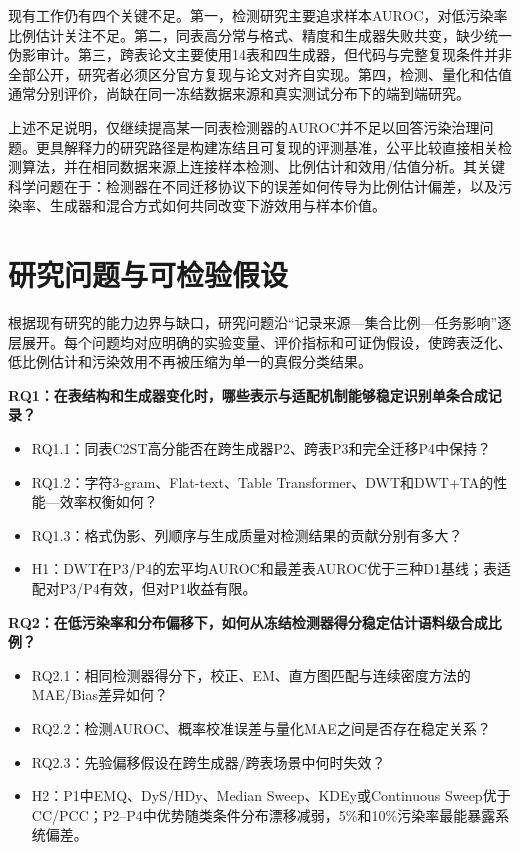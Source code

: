 \documentclass[
  chinese,
  12pt,
  a4paper,
  chinese,
  UTF8]{ctexart}
\providecommand{\tightlist}{%
  \setlength{\itemsep}{0pt}\setlength{\parskip}{0pt}}
\begin{document}
现有工作仍有四个关键不足。第一，检测研究主要追求样本AUROC，对低污染率比例估计关注不足。第二，同表高分常与格式、精度和生成器失败共变，缺少统一伪影审计。第三，跨表论文主要使用14表和四生成器，但代码与完整复现条件并非全部公开，研究者必须区分官方复现与论文对齐自实现。第四，检测、量化和估值通常分别评价，尚缺在同一冻结数据来源和真实测试分布下的端到端研究。

上述不足说明，仅继续提高某一同表检测器的AUROC并不足以回答污染治理问题。更具解释力的研究路径是构建冻结且可复现的评测基准，公平比较直接相关检测算法，并在相同数据来源上连接样本检测、比例估计和效用/估值分析。其关键科学问题在于：检测器在不同迁移协议下的误差如何传导为比例估计偏差，以及污染率、生成器和混合方式如何共同改变下游效用与样本价值。

\section{研究问题与可检验假设}\label{ux7814ux7a76ux95eeux9898ux4e0eux53efux68c0ux9a8cux5047ux8bbe}

根据现有研究的能力边界与缺口，研究问题沿``记录来源---集合比例---任务影响''逐层展开。每个问题均对应明确的实验变量、评价指标和可证伪假设，使跨表泛化、低比例估计和污染效用不再被压缩为单一的真假分类结果。

\textbf{RQ1：在表结构和生成器变化时，哪些表示与适配机制能够稳定识别单条合成记录？}

\begin{itemize}
\tightlist
\item
  RQ1.1：同表C2ST高分能否在跨生成器P2、跨表P3和完全迁移P4中保持？
\item
  RQ1.2：字符3-gram、Flat-text、Table
  Transformer、DWT和DWT+TA的性能---效率权衡如何？
\item
  RQ1.3：格式伪影、列顺序与生成质量对检测结果的贡献分别有多大？
\item
  H1：DWT在P3/P4的宏平均AUROC和最差表AUROC优于三种D1基线；表适配对P3/P4有效，但对P1收益有限。
\end{itemize}

\textbf{RQ2：在低污染率和分布偏移下，如何从冻结检测器得分稳定估计语料级合成比例？}

\begin{itemize}
\tightlist
\item
  RQ2.1：相同检测器得分下，校正、EM、直方图匹配与连续密度方法的MAE/Bias差异如何？
\item
  RQ2.2：检测AUROC、概率校准误差与量化MAE之间是否存在稳定关系？
\item
  RQ2.3：先验偏移假设在跨生成器/跨表场景中何时失效？
\item
  H2：P1中EMQ、DyS/HDy、Median Sweep、KDEy或Continuous
  Sweep优于CC/PCC；P2--P4中优势随类条件分布漂移减弱，5\%和10\%污染率最能暴露系统偏差。
\end{itemize}
\end{document}

